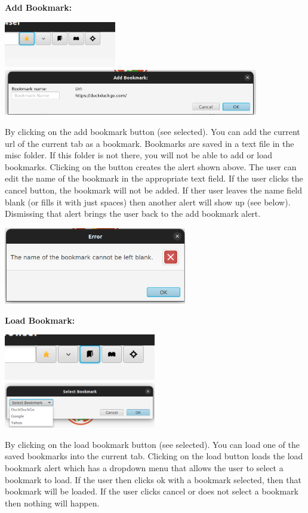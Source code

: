 \documentclass[10pt,a4paper]{report}
\begin{document}
	 
	 \LARGE \noindent \justifying \textbf{Add Bookmark:} \par
	 \noindent \includegraphics[height=20mm]{images/addBookmark.png}
	 \noindent \includegraphics[height=20mm]{images/addBookmarkAlert.png} \par
	 \normalsize \noindent By clicking on the add bookmark button (see selected). You can add the current url of the current tab as a bookmark. Bookmarks are saved in a text file in the misc folder. If this folder is not there, you will not be able to add or load bookmarks. Clicking on the button creates the alert shown above. The user can edit the name of the bookmark in the appropriate text field. If the user clicks the cancel button, the bookmark will not be added. If ther user leaves the name field blank (or fills it with just spaces) then another alert will show up (see below). Dismissing that alert brings the user back to the add bookmark alert. \par
	 \noindent \includegraphics[width=80mm]{images/blankNameBookmark.png} \par
	 
	 	\pagebreak
	 
	 \LARGE \noindent \justifying \textbf{Load Bookmark:} \par
	 \noindent \includegraphics[height=20mm]{images/loadBookmark.png}
	 \noindent \includegraphics[height=20mm]{images/loadBookmarkAlert.png} \par
	 \normalsize \noindent By clicking on the load bookmark button (see selected). You can load one of the saved bookmarks into the current tab. Clicking on the load button loads the load bookmark alert which has a dropdown menu that allows the user to select a bookmark to load. If the user then clicks ok with a bookmark selected, then that bookmark will be loaded. If the user clicks cancel or does not select a bookmark then nothing will happen. \par
	 
\end{document}
